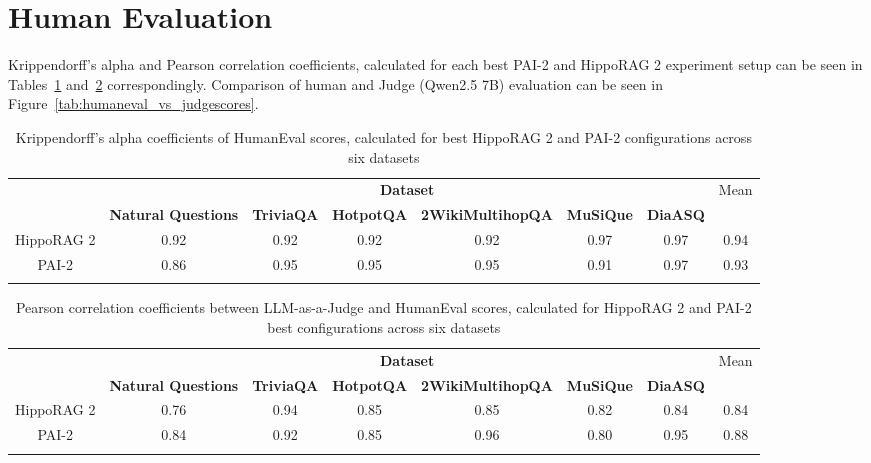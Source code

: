

\section{Human Evaluation}
\label{app:human_evaluation}

Krippendorff’s alpha and Pearson correlation coefficients, calculated for each best PAI-2 and HippoRAG 2 experiment setup can be seen in Tables~\ref{tab:humaneval_kripalpha} and~\ref{tab:humaneval_pearsoncoef} correspondingly. Comparison of human and Judge (Qwen2.5 7B) evaluation can be seen in Figure~\ref{tab:humaneval_vs_judgescores}.

\begin{table}[H]
    \centering
	\renewcommand{\arraystretch}{1.3}
    \begin{tabular}{|c|c|c|c|c|c|c||c|}
    \hhline{|-------||-|}
    \multirow{2}{*}{\textbf{Method}} & \multicolumn{6}{c||}{\textbf{Dataset}} & \multirow{2}{*}{Mean} \\ \hhline{|~|------||~|}
     & \textbf{Natural Questions} & \textbf{TriviaQA} & \textbf{HotpotQA} & \textbf{2WikiMultihopQA} & \textbf{MuSiQue} & \textbf{DiaASQ} &  \\ 
    \hhline{|=======::=}
    HippoRAG 2 & 0.92 & 0.92 & 0.92 & 0.92 & 0.97 & 0.97 & 0.94 \\ 
    \hhline{|-------||-|}
    PAI-2 & 0.86 & 0.95 & 0.95 & 0.95 & 0.91 & 0.97 & 0.93 \\ 
    \hhline{|-------||-|}
    \end{tabular}%
    \renewcommand{\arraystretch}{1}
    \caption{Krippendorff’s alpha coefficients of HumanEval scores, calculated for best HippoRAG 2 and PAI-2 configurations across six datasets}
	\label{tab:humaneval_kripalpha}
\end{table}

\begin{table}[H]
    \centering
	\renewcommand{\arraystretch}{1.3}
    \begin{tabular}{|c|c|c|c|c|c|c||c|}
    \hhline{|-------||-|}
    \multirow{2}{*}{\textbf{Method}} & \multicolumn{6}{c||}{\textbf{Dataset}} & \multirow{2}{*}{Mean} \\ \hhline{|~|------||~|}
     & \textbf{Natural Questions} & \textbf{TriviaQA} & \textbf{HotpotQA} & \textbf{2WikiMultihopQA} & \textbf{MuSiQue} & \textbf{DiaASQ} &  \\ 
    \hhline{|=======::=}
    HippoRAG 2 & 0.76 & 0.94 & 0.85 & 0.85 & 0.82 & 0.84 & 0.84 \\
    \hhline{|-------||-|}
    PAI-2 & 0.84 & 0.92 & 0.85 & 0.96 & 0.80 & 0.95 & 0.88 \\
    \hhline{|-------||-|}
    \end{tabular}%
    \renewcommand{\arraystretch}{1}
    \caption{Pearson correlation coefficients between LLM-as-a-Judge and HumanEval scores, calculated for HippoRAG 2 and PAI-2 best configurations across six datasets}
	\label{tab:humaneval_pearsoncoef}
\end{table}

